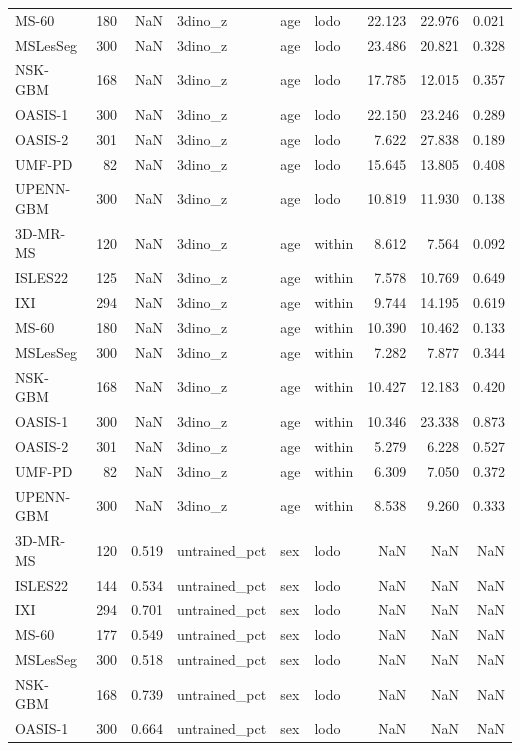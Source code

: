 \begin{tabular}{lrrlllrrr}
MS-60 & 180 & NaN & 3dino\_z & age & lodo & 22.123 & 22.976 & 0.021 \\
MSLesSeg & 300 & NaN & 3dino\_z & age & lodo & 23.486 & 20.821 & 0.328 \\
NSK-GBM & 168 & NaN & 3dino\_z & age & lodo & 17.785 & 12.015 & 0.357 \\
OASIS-1 & 300 & NaN & 3dino\_z & age & lodo & 22.150 & 23.246 & 0.289 \\
OASIS-2 & 301 & NaN & 3dino\_z & age & lodo & 7.622 & 27.838 & 0.189 \\
UMF-PD & 82 & NaN & 3dino\_z & age & lodo & 15.645 & 13.805 & 0.408 \\
UPENN-GBM & 300 & NaN & 3dino\_z & age & lodo & 10.819 & 11.930 & 0.138 \\
3D-MR-MS & 120 & NaN & 3dino\_z & age & within & 8.612 & 7.564 & 0.092 \\
ISLES22 & 125 & NaN & 3dino\_z & age & within & 7.578 & 10.769 & 0.649 \\
IXI & 294 & NaN & 3dino\_z & age & within & 9.744 & 14.195 & 0.619 \\
MS-60 & 180 & NaN & 3dino\_z & age & within & 10.390 & 10.462 & 0.133 \\
MSLesSeg & 300 & NaN & 3dino\_z & age & within & 7.282 & 7.877 & 0.344 \\
NSK-GBM & 168 & NaN & 3dino\_z & age & within & 10.427 & 12.183 & 0.420 \\
OASIS-1 & 300 & NaN & 3dino\_z & age & within & 10.346 & 23.338 & 0.873 \\
OASIS-2 & 301 & NaN & 3dino\_z & age & within & 5.279 & 6.228 & 0.527 \\
UMF-PD & 82 & NaN & 3dino\_z & age & within & 6.309 & 7.050 & 0.372 \\
UPENN-GBM & 300 & NaN & 3dino\_z & age & within & 8.538 & 9.260 & 0.333 \\
3D-MR-MS & 120 & 0.519 & untrained\_pct & sex & lodo & NaN & NaN & NaN \\
ISLES22 & 144 & 0.534 & untrained\_pct & sex & lodo & NaN & NaN & NaN \\
IXI & 294 & 0.701 & untrained\_pct & sex & lodo & NaN & NaN & NaN \\
MS-60 & 177 & 0.549 & untrained\_pct & sex & lodo & NaN & NaN & NaN \\
MSLesSeg & 300 & 0.518 & untrained\_pct & sex & lodo & NaN & NaN & NaN \\
NSK-GBM & 168 & 0.739 & untrained\_pct & sex & lodo & NaN & NaN & NaN \\
OASIS-1 & 300 & 0.664 & untrained\_pct & sex & lodo & NaN & NaN & NaN \\

\end{tabular}

